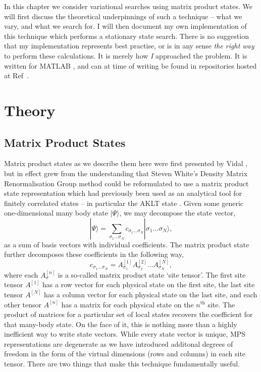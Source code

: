 In this chapter we consider variational searches using matrix product states. We will first discuss the theoretical underpinnings of such a technique -- what we vary, and what we search for. I will then document my own implementation of this technique which performs a stationary state search. There is no suggestion that my implementation represents best practise, or is in any sense \emph{the right way} to perform these calculations. It is merely how \emph{I} approached the problem. It is written for MATLAB \cite{MATLAB}, and can at time of writing be found in repositories hosted at Ref~\cite{otb:githome}.
 
 \section{Theory}
 \subsection{Matrix Product States}
 Matrix product states as we describe them here were first presented by Vidal \cite{Vidal04}, but in effect grew from the understanding that Steven White's Density Matrix Renormalisation Group method \cite{White92,White93} could be reformulated to use a matrix product state representation which had previously been used as an analytical tool for finitely correlated states -- in particular the AKLT state \cite{AKLT87}.
 Given some generic one-dimensional many body state \(|\Psi \rangle\), we may decompose the state vector,
 \begin{equation}
 	|\Psi \rangle = \sum_{\sigma_{1} \ldots \sigma_{N}} c_{\sigma_{1} \ldots \sigma_{N}}| \sigma_{1} \ldots \sigma_{N} \rangle,
 	\label{eq:mps1-1}
 \end{equation}
 as a sum of basis vectors with individual coefficients. The matrix product state further decomposes these coefficients in the following way, 
 \begin{equation}
 	c_{\sigma_{1} \ldots \sigma_{N}} = A^{[1]}_{\sigma_{1}} A^{[2]}_{\sigma_{2}} \ldots A^{[N]}_{\sigma_{N}},
 	\label{eq:mps1-2}
 \end{equation}
 where each \(A^{[n]}_{\sigma}\) is a so-called matrix product state `site tensor'. The first site tensor \(A^{[1]}\) has a row vector for each physical state on the first site, the last site tensor \(A^{[N]}\) has a column vector for each physical state on the last site, and each other tensor \(A^{[n]}\) has a matrix for each physical state on the \(n^{\mathrm{th}}\) site. The product of matrices for a particular set of local states recovers the coefficient for that many-body state. On the face of it, this is nothing more than a highly inefficient way to write state vectors. While every state vector is unique, MPS representations are degenerate as we have introduced additonal degrees of freedom in the form of the virtual dimensions (rows and columns) in each site tensor. There are two things that make this technique fundamentally useful. 
 
